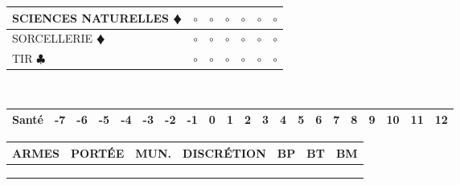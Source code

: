 \documentclass[a5paper]{letter}
\begin{document}
\begin{tabular}[c]{|p{}|p{}|p{}|p{}|p{}|p{}|p{}|}
	SCIENCES NATURELLES {\color{red} $\vardiamond$ }	&	$\circ$	&	$\circ$	&	$\circ$	&	$\circ$	&	$\circ$		&	$\circ$		\\ \hline
	SORCELLERIE {\color{red} $\vardiamond$ }			&	$\circ$	&	$\circ$	&	$\circ$	&	$\circ$	&	$\circ$		&	$\circ$		\\ \hline
	TIR { $\clubsuit$ }									&	$\circ$	&	$\circ$	&	$\circ$	&	$\circ$	&	$\circ$		&	$\circ$		\\ \hline
\end{tabular}~\\


\begin{tabular}[c]{|p{}|c|c|c|c|c|c|c|c|c|c|c|c|c|c|c|c|c|c|c|c|}
	\hline
	\textbf{Santé}	&	-7	&	-6	&	-5	&	-4	&	-3	&	-2	&	-1	&	0	&	1	&	2	&	3	&	4	&	5	&	6	&	7	&	8	&	9	&	10	&	11	&	12	\\
	\hline
\end{tabular}

\begin{tabular}[c]{|p{}|p{}|p{}|p{}|p{}|p{}|p{}|} 
	\hline
	\textbf{ARMES}	&	PORTÉE	&	MUN.	&	DISCRÉTION	&	BP	&	BT	&	BM	\\
	\hline
					&			&			&				&		&		&		\\
	\hline
					&			&			&				&		&		&		\\
	\hline
					&			&			&				&		&		&		\\
	\hline
\end{tabular}


\clearpage

\end{document}
